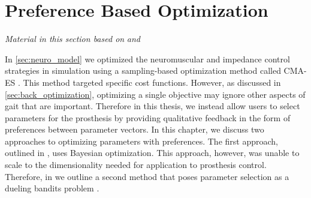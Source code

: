 \chapter{Preference Based Optimization}\label{sec:preference_optimization}

\graphicspath{{chapters/preference_optimization/figures/}}

\emph{Material in this section based on}
\citet{thatte2017sample}\cite{thatte2017sample} \emph{and}
\citet{thatte2018method}\cite[0.25in]{thatte2018method} 
\linebreak

In \cref{sec:neuro_model} we optimized the neuromuscular and impedance control
strategies in simulation using a sampling-based optimization method called
CMA-ES \citep{hansen2006cma}. This method targeted specific cost functions.
However, as discussed in \cref{sec:back_optimization}, optimizing a single
objective may ignore other aspects of gait that are important. Therefore in this
thesis, we instead allow users to select parameters for the prosthesis by
providing qualitative feedback in the form of preferences between parameter
vectors. In this chapter, we discuss two approaches to optimizing parameters
with preferences. The first approach, outlined in
, uses Bayesian optimization.
This approach, however, was unable to scale to the dimensionality needed for
application to prosthesis control. Therefore, in
 we outline a second method
that poses parameter selection as a dueling bandits problem \citep{yue2012k}.










